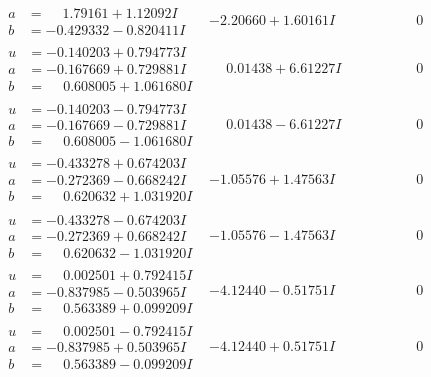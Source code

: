 \documentclass[1p]{elsarticle_modified}
\theoremstyle{definition}
\begin{document}
$$\begin{array}{c|c|c}
\begin{aligned}
a &= \phantom{-}1.79161 + 1.12092 I \\
b &= -0.429332 - 0.820411 I\end{aligned}
 & -2.20660 + 1.60161 I & \phantom{-0.000000 } 0 \\ \hline\begin{aligned}
u &= -0.140203 + 0.794773 I \\
a &= -0.167669 + 0.729881 I \\
b &= \phantom{-}0.608005 + 1.061680 I\end{aligned}
 & \phantom{-}0.01438 + 6.61227 I & \phantom{-0.000000 } 0 \\ \hline\begin{aligned}
u &= -0.140203 - 0.794773 I \\
a &= -0.167669 - 0.729881 I \\
b &= \phantom{-}0.608005 - 1.061680 I\end{aligned}
 & \phantom{-}0.01438 - 6.61227 I & \phantom{-0.000000 } 0 \\ \hline\begin{aligned}
u &= -0.433278 + 0.674203 I \\
a &= -0.272369 - 0.668242 I \\
b &= \phantom{-}0.620632 + 1.031920 I\end{aligned}
 & -1.05576 + 1.47563 I & \phantom{-0.000000 } 0 \\ \hline\begin{aligned}
u &= -0.433278 - 0.674203 I \\
a &= -0.272369 + 0.668242 I \\
b &= \phantom{-}0.620632 - 1.031920 I\end{aligned}
 & -1.05576 - 1.47563 I & \phantom{-0.000000 } 0 \\ \hline\begin{aligned}
u &= \phantom{-}0.002501 + 0.792415 I \\
a &= -0.837985 - 0.503965 I \\
b &= \phantom{-}0.563389 + 0.099209 I\end{aligned}
 & -4.12440 - 0.51751 I & \phantom{-0.000000 } 0 \\ \hline\begin{aligned}
u &= \phantom{-}0.002501 - 0.792415 I \\
a &= -0.837985 + 0.503965 I \\
b &= \phantom{-}0.563389 - 0.099209 I\end{aligned}
 & -4.12440 + 0.51751 I & \phantom{-0.000000 } 0 \\ \hline\begin{aligned}

\end{aligned}
\end{array}$$
\end{document}
